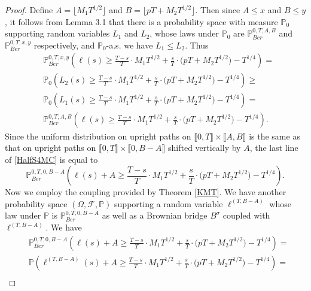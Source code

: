 \begin{proof}
	Define $A = \lfloor M_1T^{1/2}\rfloor$ and $B = \lfloor pT + M_2 T^{1/2}\rfloor$. Then since $A\leq x$ and $B\leq y$, it follows from Lemma 3.1 that there is a probability space with measure $\mathbb{P}_0$ supporting random variables $L_1$ and $L_2$, whose laws under $\mathbb{P}_0$ are $\mathbb{P}^{0,T,A,B}_{Ber}$ and $\mathbb{P}^{0,T,x,y}_{Ber}$ respectively, and $\mathbb{P}_0$-a.s. we have $L_1\leq L_2$. Thus
	\begin{equation}\label{HalfS4MC}
	\begin{split}
	&\mathbb{P}^{0,T,x,y}_{Ber}\left( \ell(s)  \geq \frac{T-s}{T} \cdot M_1 T^{1/2} + \frac{s}{T} \cdot \big(p T + M_2 T^{1/2}\big) - T^{1/4} \right) =\\
	& \mathbb{P}_0\left( L_2(s)  \geq \frac{T-s}{T} \cdot M_1 T^{1/2} + \frac{s}{T} \cdot \big(p T + M_2 T^{1/2}\big) - T^{1/4} \right) \geq\\
	&\mathbb{P}_0\left( L_1(s)  \geq \frac{T-s}{T} \cdot M_1 T^{1/2} + \frac{s}{T} \cdot \big(p T + M_2 T^{1/2}\big) - T^{1/4} \right) =\\
	&\mathbb{P}^{0,T,A,B}_{Ber}\left( \ell(s)  \geq \frac{T-s}{T} \cdot M_1 T^{1/2} + \frac{s}{T} \cdot \big(p T + M_2 T^{1/2}\big) - T^{1/4} \right).
	\end{split}
	\end{equation}
	Since the uniform distribution on upright paths on $\llbracket 0,T\rrbracket \times \llbracket A,B\rrbracket$ is the same as that on upright paths on $\llbracket 0,T\rrbracket \times \llbracket 0, B-A\rrbracket$ shifted vertically by $A$, the last line of \eqref{HalfS4MC} is equal to
	\[
	\mathbb{P}^{0,T,0,B-A}_{Ber}\left( \ell(s) + A  \geq \frac{T-s}{T} \cdot M_1 T^{1/2} + \frac{s}{T} \cdot \big(p T + M_2 T^{1/2}\big) - T^{1/4} \right).
	\]
	Now we employ the coupling provided by Theorem \ref{KMT}. We have another probability space $(\Omega,\mathcal{F},\mathbb{P})$ supporting a random variable $\ell^{(T,B-A)}$ whose law under $\mathbb{P}$ is $\mathbb{P}^{0,T,0,B-A}_{Ber}$ as well as a Brownian bridge $B^\sigma$ coupled with $\ell^{(T,B-A)}$. We have 
	\begin{equation}\label{HalfS4split}
	\begin{split}
	&\mathbb{P}^{0,T,0,B-A}_{Ber}\left( \ell(s) + A  \geq \frac{T-s}{T} \cdot M_1 T^{1/2} + \frac{s}{T} \cdot \big(p T + M_2 T^{1/2}\big) - T^{1/4} \right) =\\
	& \mathbb{P}\left( \ell^{(T,B-A)}(s) + A \geq \frac{T-s}{T} \cdot M_1 T^{1/2} + \frac{s}{T} \cdot \big(p T + M_2 T^{1/2}\big) - T^{1/4} \right) =\\

\end{split}
\end{equation}
\end{proof}
